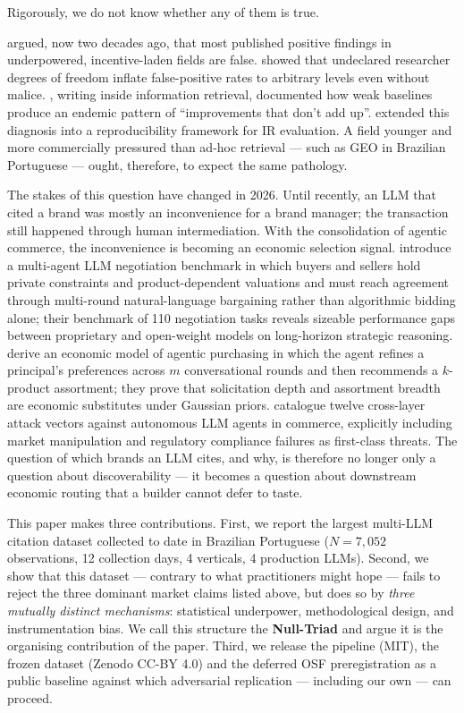 \documentclass[preprint,12pt,authoryear]{elsarticle}
\begin{document}
Rigorously, we do not know whether any of them is true.

\citet{Ioannidis2005} argued, now two decades ago, that most published positive findings in underpowered, incentive-laden fields are false. \citet{Simmons2011} showed that undeclared researcher degrees of freedom inflate false-positive rates to arbitrary levels even without malice. \citet{Armstrong2009}, writing inside information retrieval, documented how weak baselines produce an endemic pattern of ``improvements that don't add up''. \citet{Ferro2017} extended this diagnosis into a reproducibility framework for IR evaluation. A field younger and more commercially pressured than ad-hoc retrieval --- such as GEO in Brazilian Portuguese --- ought, therefore, to expect the same pathology.

The stakes of this question have changed in 2026. Until recently, an LLM that cited a brand was mostly an inconvenience for a brand manager; the transaction still happened through human intermediation. With the consolidation of agentic commerce, the inconvenience is becoming an economic selection signal. \citet{Liu2026AgenticPay} introduce a multi-agent LLM negotiation benchmark in which buyers and sellers hold private constraints and product-dependent valuations and must reach agreement through multi-round natural-language bargaining rather than algorithmic bidding alone; their benchmark of 110 negotiation tasks reveals sizeable performance gaps between proprietary and open-weight models on long-horizon strategic reasoning. \citet{Cao2026Solicit} derive an economic model of agentic purchasing in which the agent refines a principal's preferences across $m$ conversational rounds and then recommends a $k$-product assortment; they prove that solicitation depth and assortment breadth are economic substitutes under Gaussian priors. \citet{Mao2026SoK} catalogue twelve cross-layer attack vectors against autonomous LLM agents in commerce, explicitly including market manipulation and regulatory compliance failures as first-class threats. The question of which brands an LLM cites, and why, is therefore no longer only a question about discoverability --- it becomes a question about downstream economic routing that a builder cannot defer to taste.

This paper makes three contributions. First, we report the largest multi-LLM citation dataset collected to date in Brazilian Portuguese ($N=7{,}052$ observations, 12 collection days, 4 verticals, 4 production LLMs). Second, we show that this dataset --- contrary to what practitioners might hope --- fails to reject the three dominant market claims listed above, but does so by \emph{three mutually distinct mechanisms}: statistical underpower, methodological design, and instrumentation bias. We call this structure the \textbf{Null-Triad} and argue it is the organising contribution of the paper. Third, we release the pipeline (MIT), the frozen dataset (Zenodo CC-BY 4.0) and the deferred OSF preregistration as a public baseline against which adversarial replication --- including our own --- can proceed.
\end{document}

